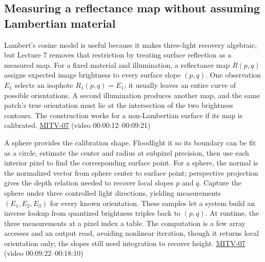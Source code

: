 \subsection{Measuring a reflectance map without assuming Lambertian material}\label{04-visual-computing-ii-ch032-measuring-a-reflectance-map-without-assuming-lambertian-material}

\hypertarget{04-visual-computing-ii-ch032-measuring-a-reflectance-map-without-assuming-lambertian-material}{}

Lambert's cosine model is useful because it makes three-light recovery algebraic, but Lecture 7 removes that restriction by treating surface reflection as a measured map. For a fixed material and illumination, a reflectance map \(R(p,q)\) assigns expected image brightness to every surface slope \((p,q)\). One observation \(E_1\) selects an isophote \(R_1(p,q)=E_1\); it usually leaves an entire curve of possible orientations. A second illumination produces another map, and the same patch's true orientation must lie at the intersection of the two brightness contours. The construction works for a non-Lambertian surface if its map is calibrated. \hyperref[04-visual-computing-ii-ch036-mitv-07---gradient-space-reflectance-map-image-irradiance-equation-gnomonic-projection]{MITV-07} (video 00:00:12--00:09:21)

A sphere provides the calibration shape. Floodlight it so its boundary can be fit as a circle, estimate the center and radius at subpixel precision, then use each interior pixel to find the corresponding surface point. For a sphere, the normal is the normalized vector from sphere center to surface point; perspective projection gives the depth relation needed to recover local slopes \(p\) and \(q\). Capture the sphere under three controlled light directions, yielding measurements \((E_1,E_2,E_3)\) for every known orientation. These samples let a system build an inverse lookup from quantized brightness triples back to \((p,q)\). At runtime, the three measurements at a pixel index a table. The computation is a few array accesses and an output read, avoiding nonlinear iteration, though it returns local orientation only; the slopes still need integration to recover height. \hyperref[04-visual-computing-ii-ch036-mitv-07---gradient-space-reflectance-map-image-irradiance-equation-gnomonic-projection]{MITV-07} (video 00:09:22--00:18:10)

